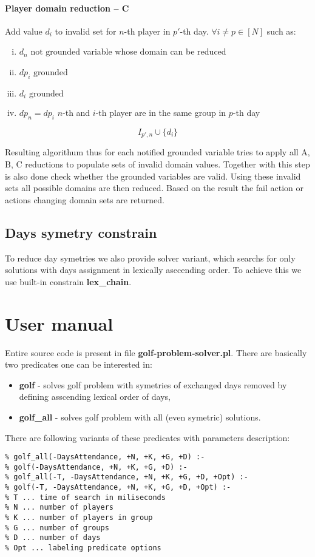 \documentclass[a4paper]{article}
\theoremstyle{definition}
\theoremstyle{remark}
\newcommand{\ccc}[1]{{\mbox{\fontfamily{lmtt}\selectfont\textbf{#1}}}}
\begin{document}
\paragraph{Player domain reduction -- C}
Add value $d_i$ to invalid set for $n$-th player in  $p'$-th day.
$ \forall i \neq p \in [N]$ such as:
\begin{enumerate}[(i)]
\item $d_n \text{ not grounded}$ \hfill variable whose domain can be reduced 
\item $dp_i \text{ grounded}$ 
\item $d_i \text{ grounded}$ 
\item $dp_n = dp_i$ \hfill $n$-th and $i$-th player are in the same group in $p$-th day
\end{enumerate}
$$ I_{p',n} \cup \{ d_i \} $$

Resulting algorithum thus for each notified grounded variable tries to apply all A, B, C reductions
to populate sets of invalid domain values. Together with this step is also done check whether
the grounded variables are valid. Using these invalid sets all possible domains are then reduced.
Based on the result the fail action or actions changing domain sets are returned.  

\subsection{Days symetry constrain }
To reduce day symetries we also provide solver variant, which searchs for 
only solutions with days assignment in lexically asecending order. To achieve this
we use built-in constrain \ccc{lex\_chain}.

\section{User manual}
Entire source code is present in file \ccc{golf-problem-solver.pl}.
There are basically two predicates one can be interested in:
\begin{itemize}
\item \ccc{golf} - solves golf problem with symetries of exchanged days removed by defining asscending lexical order of days,
\item \ccc{golf\_all} - solves golf problem with all (even symetric) solutions. 
\end{itemize}

There are following variants of these predicates with parameters description:
\begin{verbatim}
% golf_all(-DaysAttendance, +N, +K, +G, +D) :- 
% golf(-DaysAttendance, +N, +K, +G, +D) :- 
% golf_all(-T, -DaysAttendance, +N, +K, +G, +D, +Opt) :- 
% golf(-T, -DaysAttendance, +N, +K, +G, +D, +Opt) :- 
% T ... time of search in miliseconds
% N ... number of players
% K ... number of players in group
% G ... number of groups
% D ... number of days
% Opt ... labeling predicate options
\end{verbatim}
\end{document}
